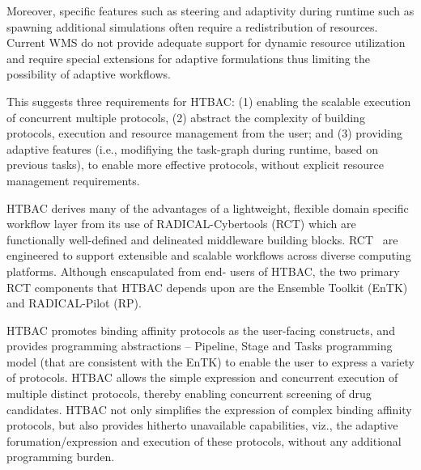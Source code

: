 Moreover, specific features such as steering and adaptivity during runtime
such as spawning additional simulations often require a redistribution of
resources. Current WMS do not provide adequate support for dynamic resource
utilization and require special extensions for adaptive formulations thus
limiting the possibility of adaptive workflows. 






This suggests three requirements for HTBAC\@: (1) enabling the scalable
execution of concurrent multiple protocols, (2) abstract the complexity of
building protocols, execution and resource management from the user; and (3)
providing adaptive features (i.e., modifiying the task-graph during runtime,
based on previous tasks), to enable more effective protocols, without explicit
resource management requirements.


HTBAC derives many of the advantages of a lightweight, flexible domain
specific workflow layer from its use of RADICAL-Cybertools (RCT) which are
functionally well-defined and delineated middleware building blocks.
RCT~\cite{review_bb_2016} are engineered to support extensible and scalable
workflows across diverse computing platforms. Although enscapulated from end-
users of HTBAC, the two primary RCT components that HTBAC depends upon are the
Ensemble Toolkit (EnTK) and RADICAL-Pilot (RP).

HTBAC promotes binding affinity protocols as the user-facing constructs, and
provides programming abstractions -- Pipeline, Stage and Tasks programming
model (that are consistent with the EnTK) to enable the user to express a
variety of protocols. HTBAC allows the simple expression and concurrent
execution of multiple distinct protocols, thereby enabling concurrent
screening of drug candidates. HTBAC not only simplifies the expression of
complex binding affinity protocols, but also provides hitherto unavailable
capabilities, viz., the adaptive forumation/expression and execution of these
protocols, without any additional programming burden.


